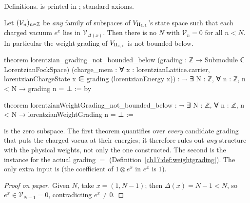 \begin{status}
Definitions.   is printed in
; standard axioms.
\end{status}

\begin{theorem}\label{ch17:thm:notbounded}
Let $(\mathcal V_n)_{n\in{\mathbb{Z}}}$ be \emph{any} family of subspaces of ${V_{\mathrm{II}_{1,1}}}$'s state space such that each
charged vacuum $e^x$ lies in $\mathcal V_{\Delta(x)}$.  Then there is no $N$ with $\mathcal V_n=0$ for all $n<N$.
In particular the weight grading of ${V_{\mathrm{II}_{1,1}}}$ is not bounded below.
\end{theorem}

\begin{leancode}
theorem lorentzian_grading_not_bounded_below
    (grading : ℤ → Submodule ℂ LorentzianFockSpace)
    (charge_mem : ∀ x : lorentzianLattice.carrier,
      lorentzianChargeState x ∈ grading (lorentzianEnergy x)) :
    ¬ ∃ N : ℤ, ∀ n : ℤ, n < N → grading n = ⊥ := by

theorem lorentzianWeightGrading_not_bounded_below :
    ¬ ∃ N : ℤ, ∀ n : ℤ, n < N → lorentzianWeightGrading n = ⊥ :=
\end{leancode}

\begin{dictionary}
 is the zero subspace.  The first theorem quantifies over \emph{every} candidate grading that puts
the charged vacua at their energies; it therefore rules out \emph{any} 
structure with the physical weights, not only the one constructed.  The second is the instance for the
actual grading  $=$ 
(Definition~\ref{ch17:def:weightgrading}).  The only extra input is 
(the coefficient of $1\otimes e^x$ in $e^x$ is $1$).
\end{dictionary}

\begin{proof}[Proof on paper]
Given $N$, take $x=(1,N-1)$; then $\Delta(x)=N-1<N$, so $e^x\in\mathcal V_{N-1}=0$, contradicting $e^x\neq0$.
\end{proof}


